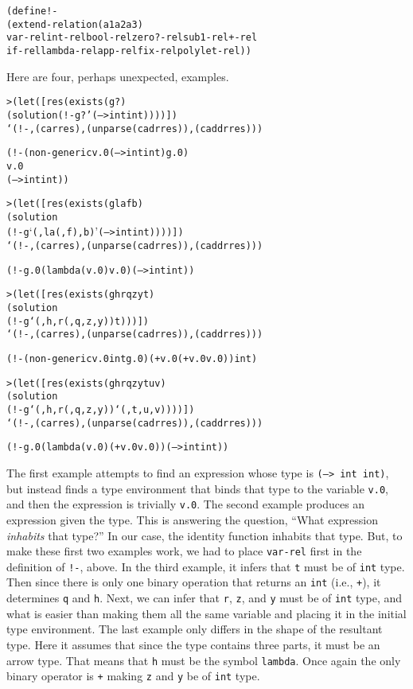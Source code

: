 \begin{alltt}
(define !-
  (extend-relation (a1 a2 a3)
    var-rel int-rel bool-rel zero?-rel sub1-rel +-rel 
    if-rel lambda-rel app-rel fix-rel polylet-rel))
\end{alltt}

Here are four, perhaps unexpected, examples.

\begin{alltt}
> (let ([res (exists (g ?)
               (solution (!- g ? '(--> int int))))])
    `(!- ,(car res) ,(unparse (cadr res)) ,(caddr res)))

(!- (non-generic v.0 (--> int int) g.0)
    v.0
    (--> int int))
\end{alltt}

\begin{alltt}
> (let ([res (exists (g la f b)
               (solution
                 (!- g `(,la (,f) ,b) '(--> int int))))])
    `(!- ,(car res) ,(unparse (cadr res)) ,(caddr res)))

(!- g.0 (lambda (v.0) v.0) (--> int int))
\end{alltt}

\begin{alltt}
> (let ([res (exists (g h r q z y t)
               (solution 
                  (!- g `(,h ,r (,q ,z ,y)) t)))])
    `(!- ,(car res) ,(unparse (cadr res)) ,(caddr res)))

(!- (non-generic v.0 int g.0) (+ v.0 (+ v.0 v.0)) int)
\end{alltt}

\begin{alltt}
> (let ([res (exists (g h r q z y t u v)
               (solution
                 (!- g `(,h ,r (,q ,z ,y)) `(,t ,u ,v))))])
    `(!- ,(car res) ,(unparse (cadr res)) ,(caddr res)))

(!- g.0 (lambda (v.0) (+ v.0 v.0)) (--> int int))
\end{alltt}

The first example attempts to find an expression whose type is
\texttt{(--> int int)}, but instead finds a type environment that
binds that type to the variable \texttt{v.0}, and then the expression is
trivially \texttt{v.0}.  The second example produces an expression
given the type.  This is answering the question, ``What expression
\emph{inhabits} that type?''  In our case, the identity function
inhabits that type.  But, to make these first two examples work, we
had to place \texttt{var-rel} first in the definition of
\texttt{!-}, above.  In the third example, it infers that \texttt{t}
must be of \texttt{int} type.  Then since there is only one binary
operation that returns an \texttt{int} (i.e., \texttt{+}), it
determines \texttt{q} and \texttt{h}.  Next, we can infer that \texttt{r},
\texttt{z}, and \texttt{y} must be of \texttt{int} type, and what is
easier than making them all the same variable and placing it in the
initial type environment.  The last example only differs in the shape
of the resultant type.  Here it assumes that since the type contains
three parts, it must be an arrow type.  That means that \texttt{h}
must be the symbol \texttt{lambda}. Once again the only binary
operator is \texttt{+} making \texttt{z} and \texttt{y} be of
\texttt{int} type.

